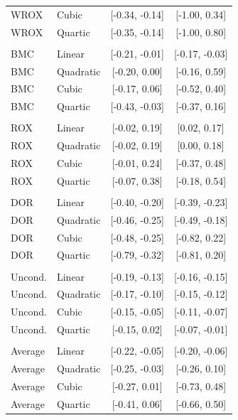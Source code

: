 \documentclass[11pt]{article}
\theoremstyle{definition}
\newcommand{\0}{\ensuremath{\mathbf{0}}}
\begin{document}
\begin{bibunit}
\begin{table}[htbp]
\begin{tabular}{llcc}
    WROX  & Cubic  & [-0.34, -0.14] & [-1.00, 0.34] \\
    WROX  & Quartic  & [-0.35, -0.14] & [-1.00, 0.80] \\
          &       &       &  \\
    BMC   & Linear  & [-0.21, -0.01] & [-0.17, -0.03] \\
    BMC   & Quadratic  & [-0.20, 0.00] & [-0.16, 0.59] \\
    BMC   & Cubic  & [-0.17, 0.06] & [-0.52, 0.40] \\
    BMC   & Quartic  & [-0.43, -0.03] & [-0.37, 0.16] \\
          &       &       &  \\
    ROX   & Linear  & [-0.02, 0.19] & [0.02, 0.17] \\
    ROX   & Quadratic  & [-0.02, 0.19] & [0.00, 0.18] \\
    ROX   & Cubic  & [-0.01, 0.24] & [-0.37, 0.48] \\
    ROX   & Quartic  & [-0.07, 0.38] & [-0.18, 0.54] \\
          &       &       &  \\
    DOR   & Linear  & [-0.40, -0.20] & [-0.39, -0.23] \\
    DOR   & Quadratic  & [-0.46, -0.25] & [-0.49, -0.18] \\
    DOR   & Cubic  & [-0.48, -0.25] & [-0.82, 0.22] \\
    DOR   & Quartic  & [-0.79, -0.32] & [-0.81, 0.20] \\
          &       &       &  \\
    Uncond.  & Linear  & [-0.19, -0.13] & [-0.16, -0.15] \\
    Uncond.  & Quadratic  & [-0.17, -0.10] & [-0.15, -0.12] \\
    Uncond.  & Cubic  & [-0.15, -0.05] & [-0.11, -0.07] \\
    Uncond.  & Quartic  & [-0.15, 0.02] & [-0.07, -0.01] \\
          &       &       &  \\
    Average & Linear  & [-0.22, -0.05] & [-0.20, -0.06] \\
    Average & Quadratic  & [-0.25, -0.03] & [-0.26, 0.10] \\
    Average & Cubic  & [-0.27, 0.01] & [-0.73, 0.48] \\
    Average & Quartic  & [-0.41, 0.06] & [-0.66, 0.50] \\
    \bottomrule
    \end{tabular}%
  \label{tab:P-MPRTE}%


\end{table}
\end{bibunit}
\end{document}
